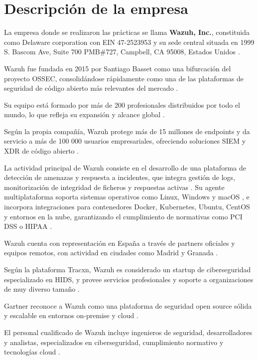 \chapter{Descripción de la empresa}

La empresa donde se realizaron las prácticas se llama \textbf{Wazuh, Inc.}, constituida como Delaware corporation con EIN 47-2523953 y su sede central situada en 1999 S. Bascom Ave, Suite 700 PMB\#727, Campbell, CA 95008, Estados Unidos \cite{wazuh_support_agreement}. 

Wazuh fue fundada en 2015 por Santiago Basset como una bifurcación del proyecto OSSEC, consolidándose rápidamente como una de las plataformas de seguridad de código abierto más relevantes del mercado \cite{wazuh_wikipedia_es}. 

Su equipo está formado por más de 200 profesionales distribuidos por todo el mundo, lo que refleja su expansión y alcance global \cite{wazuh_linkedin}. 

Según la propia compañía, Wazuh protege más de 15 millones de endpoints y da servicio a más de 100 000 usuarios empresariales, ofreciendo soluciones SIEM y XDR de código abierto \cite{wazuh_homepage}. 

La actividad principal de Wazuh consiste en el desarrollo de una plataforma de detección de amenazas y respuesta a incidentes, que integra gestión de logs, monitorización de integridad de ficheros y respuestas activas \cite{wazuh_homepage}. Su agente multiplataforma soporta sistemas operativos como Linux, Windows y macOS \cite{wazuh_agent_installation}, e incorpora integraciones para contenedores Docker, Kubernetes, Ubuntu, CentOS y entornos en la nube, garantizando el cumplimiento de normativas como PCI DSS o HIPAA \cite{wazuh_regulatory_compliance}. 

Wazuh cuenta con representación en España a través de partners oficiales y equipos remotos, con actividad en ciudades como Madrid y Granada \cite{wazuh_partners}. 

Según la plataforma Tracxn, Wazuh es considerado un startup de ciberseguridad especializado en HIDS, y provee servicios profesionales y soporte a organizaciones de muy diverso tamaño \cite{wazuh_tracxn}. 

Gartner reconoce a Wazuh como una plataforma de seguridad open source sólida y escalable en entornos on-premise y cloud \cite{wazuh_gartner}. 

El personal cualificado de Wazuh incluye ingenieros de seguridad, desarrolladores y analistas, especializados en ciberseguridad, cumplimiento normativo y tecnologías cloud \cite{wazuh_linkedin}. 

